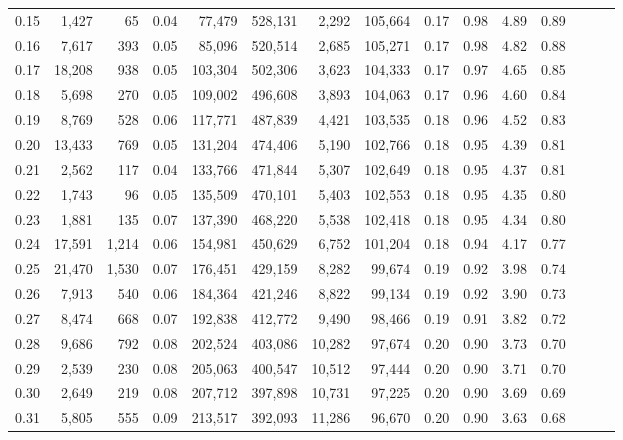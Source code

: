 \begin{tabular}{rrrrrrrrrrrrrrr}
0.15 &   1,427 &     65 &  0.04 &   77,479 &  528,131 &    2,292 &  105,664 &  0.17 &  0.98 &  4.89 &      0.89 \\
0.16 &   7,617 &    393 &  0.05 &   85,096 &  520,514 &    2,685 &  105,271 &  0.17 &  0.98 &  4.82 &      0.88 \\
0.17 &  18,208 &    938 &  0.05 &  103,304 &  502,306 &    3,623 &  104,333 &  0.17 &  0.97 &  4.65 &      0.85 \\
0.18 &   5,698 &    270 &  0.05 &  109,002 &  496,608 &    3,893 &  104,063 &  0.17 &  0.96 &  4.60 &      0.84 \\
0.19 &   8,769 &    528 &  0.06 &  117,771 &  487,839 &    4,421 &  103,535 &  0.18 &  0.96 &  4.52 &      0.83 \\
0.20 &  13,433 &    769 &  0.05 &  131,204 &  474,406 &    5,190 &  102,766 &  0.18 &  0.95 &  4.39 &      0.81 \\
0.21 &   2,562 &    117 &  0.04 &  133,766 &  471,844 &    5,307 &  102,649 &  0.18 &  0.95 &  4.37 &      0.81 \\
0.22 &   1,743 &     96 &  0.05 &  135,509 &  470,101 &    5,403 &  102,553 &  0.18 &  0.95 &  4.35 &      0.80 \\
0.23 &   1,881 &    135 &  0.07 &  137,390 &  468,220 &    5,538 &  102,418 &  0.18 &  0.95 &  4.34 &      0.80 \\
0.24 &  17,591 &  1,214 &  0.06 &  154,981 &  450,629 &    6,752 &  101,204 &  0.18 &  0.94 &  4.17 &      0.77 \\
0.25 &  21,470 &  1,530 &  0.07 &  176,451 &  429,159 &    8,282 &   99,674 &  0.19 &  0.92 &  3.98 &      0.74 \\
0.26 &   7,913 &    540 &  0.06 &  184,364 &  421,246 &    8,822 &   99,134 &  0.19 &  0.92 &  3.90 &      0.73 \\
0.27 &   8,474 &    668 &  0.07 &  192,838 &  412,772 &    9,490 &   98,466 &  0.19 &  0.91 &  3.82 &      0.72 \\
0.28 &   9,686 &    792 &  0.08 &  202,524 &  403,086 &   10,282 &   97,674 &  0.20 &  0.90 &  3.73 &      0.70 \\
0.29 &   2,539 &    230 &  0.08 &  205,063 &  400,547 &   10,512 &   97,444 &  0.20 &  0.90 &  3.71 &      0.70 \\
0.30 &   2,649 &    219 &  0.08 &  207,712 &  397,898 &   10,731 &   97,225 &  0.20 &  0.90 &  3.69 &      0.69 \\
0.31 &   5,805 &    555 &  0.09 &  213,517 &  392,093 &   11,286 &   96,670 &  0.20 &  0.90 &  3.63 &      0.68 \\

\end{tabular}
